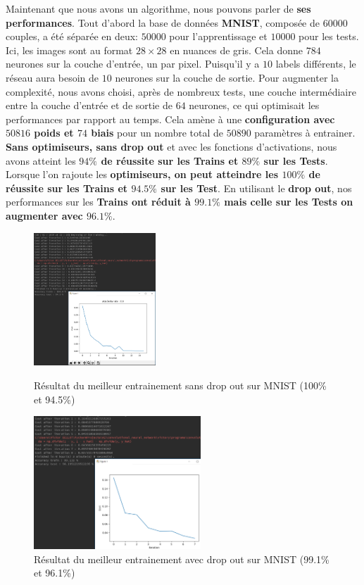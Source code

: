 \documentclass[12pt,a4paper]{extarticle}
\begin{document}
Maintenant que nous avons un algorithme, nous pouvons parler de \textbf{ses performances}. Tout d’abord la base de données \textbf{MNIST}, composée de $60 000$ couples, a été séparée en deux: $50 000$ pour l’apprentissage et $10 000$ pour les tests. Ici, les images sont au format $28\times 28$ en nuances de gris. Cela donne $784$ neurones sur la couche d'entrée, un par pixel. Puisqu'il y a $10$ labels différents, le réseau aura besoin de $10$ neurones sur la couche de sortie. Pour augmenter la complexité, nous avons choisi, après de nombreux tests, une couche intermédiaire entre la couche d'entrée et de sortie de $64$ neurones, ce qui optimisait les performances par rapport au temps. Cela amène à une \textbf{configuration avec $50 816$ poids et $74$ biais} pour un nombre total de $50 890$ paramètres à entrainer. \textbf{Sans optimiseurs, sans drop out} et avec les fonctions d'activations, nous avons atteint les \textbf{$94\%$ de réussite sur les Trains et $89\%$ sur les Tests}. Lorsque l'on rajoute les \textbf{optimiseurs, on peut atteindre les $100\%$ de réussite sur les Trains et $94.5\%$ sur les Test}. En utilisant le \textbf{drop out}, nos performances sur les \textbf{Trains ont réduit à $99.1\%$ mais celle sur les Tests on augmenter avec $96.1\%$}. 

\begin{figure}[h]
    \begin{minipage}[c]{.46\linewidth}
        \centering
        \includegraphics[height=5cm]{fin_du_game}
        \caption{Résultat du meilleur entrainement sans drop out sur MNIST (100\% et 94.5\%)}
    \end{minipage}
    \hfill%
    \begin{minipage}[c]{.46\linewidth}
        \centering
        \includegraphics[height=5cm]{retour_aux_sources}
        \caption{Résultat du meilleur entrainement avec drop out sur MNIST (99.1\% et 96.1\%)}
    \end{minipage}
\end{figure}
\end{document}
